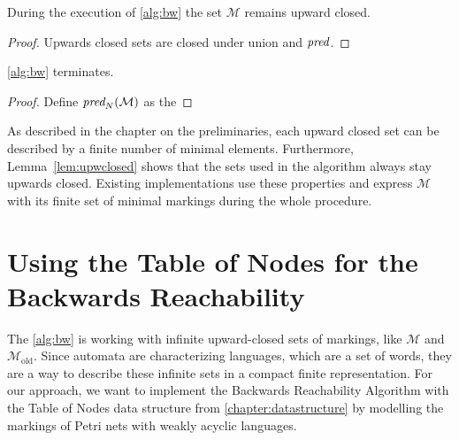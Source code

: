 \begin{lemma}\label{lem:upwclosed}
During the execution of \autoref{alg:bw} the set $\mathcal{M}$ remains upward closed. 
\end{lemma}
\begin{proof}
Upwards closed sets are closed under union and $\operatorname{\textit{pred}}$. 
\end{proof}


\begin{lemma}\label{lem:bwterm}
\autoref{alg:bw} terminates. 
\end{lemma}
\begin{proof}
Define $\operatorname{\textit{pred}}_{N}(\mathcal{M})$ as the 
\end{proof}

As described in the chapter on the preliminaries, each upward closed set can be described by a finite number of minimal elements. Furthermore, Lemma~\autoref{lem:upwclosed} shows that the sets used in the algorithm always stay upwards closed. Existing implementations use these properties and express $\mathcal{M}$ with its finite set of minimal markings during the whole procedure.




\section{Using the Table of Nodes for the Backwards Reachability}
The \autoref{alg:bw} is working with infinite upward-closed sets of markings, like $\mathcal{M}$ and $\mathcal{M}_{\text{old}}$. Since automata are characterizing languages, which are a set of words, they are a way to describe these infinite sets in a compact finite representation. For our approach, we want to implement the Backwards Reachability Algorithm with the Table of Nodes data structure from \autoref{chapter:datastructure} by modelling the markings of Petri nets with weakly acyclic languages. 


